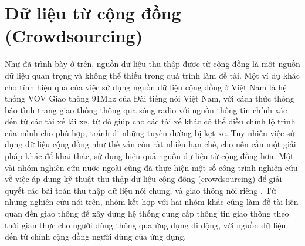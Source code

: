 \section{Dữ liệu từ cộng đồng (Crowdsourcing)}
Như đã trình bày ở trên, nguồn dữ liệu thu thập được từ cộng đồng là một nguồn dữ liệu quan trọng và không thể thiếu trong quá trình làm đề tài. Một ví dụ khác cho tính hiệu quả của việc sử dụng nguồn dữ liệu cộng đồng ở Việt Nam là hệ thống VOV Giao thông 91Mhz của Đài tiếng nói Việt Nam, với cách thức thông báo tình trạng giao thông thông qua sóng radio với nguồn thông tin chính xác đến từ các tài xế lái xe, từ đó giúp cho các tài xế khác có thể điều chỉnh lộ trình của mình cho phù hợp, tránh đi những tuyến đường bị kẹt xe. Tuy nhiên việc sử dụng dữ liệu cộng đồng như thế vẫn còn rất nhiều hạn chế, cho nên cần một giải pháp khác để khai thác, sử dụng hiệu quả nguồn dữ liệu từ cộng đồng hơn. Một vài nhóm nghiên cứu nước ngoài cũng đã thực hiện một số công trình nghiên cứu về việc áp dụng kỹ thuật thu thập dữ liệu cộng đồng (crowdsourcing) để giải quyết các bài toán thu thập dữ liệu nói chung, và giao thông nói riêng \cite{CROWND1} \cite{CROWND2} \cite{CROWND3} \cite{CROWND4}. Từ những nghiên cứu nói trên, nhóm kết hợp với hai nhóm khác cũng làm đề tài liên quan đến giao thông để xây dựng hệ thống cung cấp thông tin giao thông theo thời gian thực cho người dùng thông qua ứng dụng di động, với nguồn dữ liệu đến từ chính cộng đồng người dùng của ứng dụng.